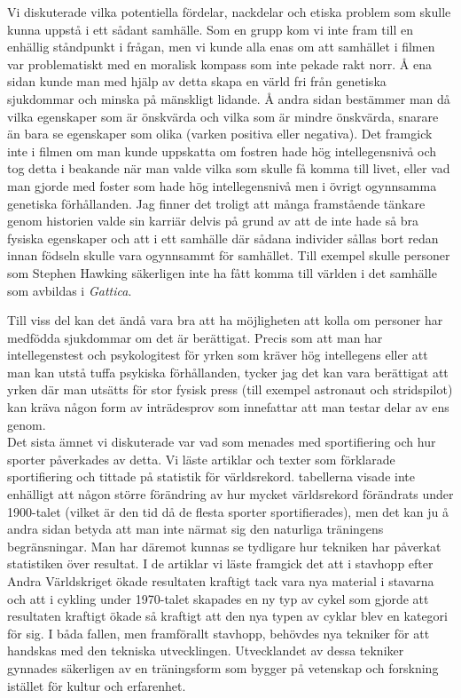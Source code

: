 \documentclass[12pt,a4paper]{article}
\begin{document}
Vi diskuterade vilka potentiella fördelar, nackdelar och etiska problem som skulle kunna uppstå i ett sådant samhälle.
Som en grupp kom vi inte fram till en enhällig ståndpunkt i frågan, men vi kunde alla enas om att samhället i filmen var problematiskt med en moralisk kompass som inte pekade rakt norr.
Å ena sidan kunde man med hjälp av detta skapa en värld fri från genetiska sjukdommar och minska på mänskligt lidande.
Å andra sidan bestämmer man då vilka egenskaper som är önskvärda och vilka som är mindre önskvärda, snarare än bara se egenskaper som olika (varken positiva eller negativa).
Det framgick inte i filmen om man kunde uppskatta om fostren hade hög intellegensnivå och tog detta i beakande när man valde vilka som skulle få komma till livet, eller vad man gjorde med foster som hade hög intellegensnivå men i övrigt ogynnsamma genetiska förhållanden.
Jag finner det troligt att många framstående tänkare genom historien valde sin karriär delvis på grund av att de inte hade så bra fysiska egenskaper och att i ett samhälle där sådana individer sållas bort redan innan födseln skulle vara ogynnsammt för samhället.
Till exempel skulle personer som Stephen Hawking säkerligen inte ha fått komma till världen i det samhälle som avbildas i \textit{Gattica}.

Till viss del kan det ändå vara bra att ha möjligheten att kolla om personer har medfödda sjukdommar om det är berättigat.
Precis som att man har intellegenstest och psykologitest för yrken som kräver hög intellegens eller att man kan utstå tuffa psykiska förhållanden, tycker jag det kan vara berättigat att yrken där man utsätts för stor fysisk press (till exempel astronaut och stridspilot) kan kräva någon form av inträdesprov som innefattar att man testar delar av ens genom.\\

\noindent Det sista ämnet vi diskuterade var vad som menades med sportifiering och hur sporter påverkades av detta.
Vi läste artiklar och texter som förklarade sportifiering och tittade på statistik för världsrekord.
tabellerna visade inte enhälligt att någon större förändring av hur mycket världsrekord förändrats under 1900-talet (vilket är den tid då de flesta sporter sportifierades), men det kan ju å andra sidan betyda att man inte närmat sig den naturliga träningens begränsningar.
Man har däremot kunnas se tydligare hur tekniken har påverkat statistiken över resultat.
I de artiklar vi läste framgick det att i stavhopp efter Andra Världskriget ökade resultaten kraftigt tack vara nya material i stavarna och att i cykling under 1970-talet skapades en ny typ av cykel som gjorde att resultaten kraftigt ökade så kraftigt att den nya typen av cyklar blev en kategori för sig.
I båda fallen, men framförallt stavhopp, behövdes nya tekniker för att handskas med den tekniska utvecklingen.
Utvecklandet av dessa tekniker gynnades säkerligen av en träningsform som bygger på vetenskap och forskning istället för kultur och erfarenhet.
\end{document}
